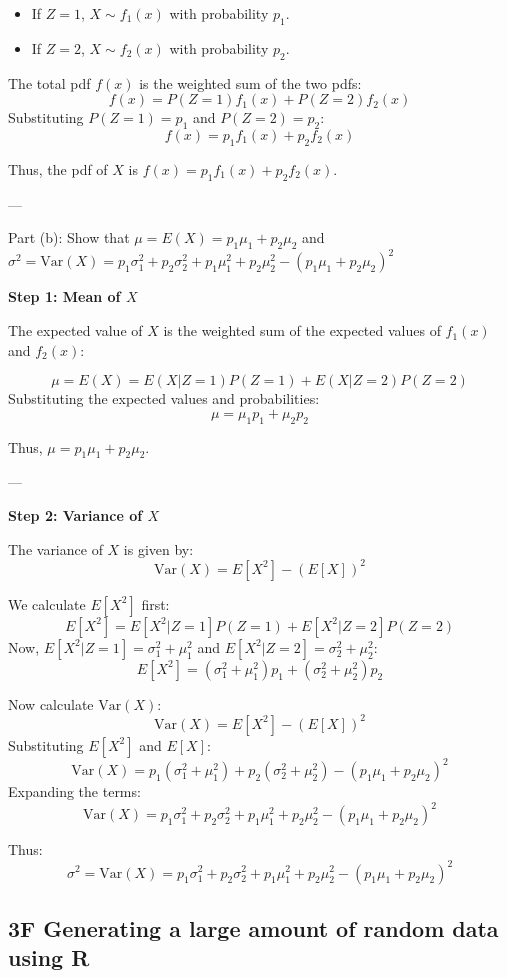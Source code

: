 \documentclass{article}
\begin{document}
\begin{itemize}
    \item If \(Z = 1\), \(X \sim f_1(x)\) with probability \(p_1\).
    \item If \(Z = 2\), \(X \sim f_2(x)\) with probability \(p_2\).
\end{itemize}

The total pdf \(f(x)\) is the weighted sum of the two pdfs:
\[
f(x) = P(Z = 1)f_1(x) + P(Z = 2)f_2(x)
\]
Substituting \(P(Z = 1) = p_1\) and \(P(Z = 2) = p_2\):
\[
f(x) = p_1 f_1(x) + p_2 f_2(x)
\]

Thus, the pdf of \(X\) is \(f(x) = p_1f_1(x) + p_2f_2(x)\).

---

Part (b): Show that \( \mu = E(X) = p_1\mu_1 + p_2\mu_2 \) and \( \sigma^2 = \text{Var}(X) = p_1\sigma_1^2 + p_2\sigma_2^2 + p_1\mu_1^2 + p_2\mu_2^2 - (p_1\mu_1 + p_2\mu_2)^2 \)
\newline

\textbf{Step 1: Mean of \(X\)}

The expected value of \(X\) is the weighted sum of the expected values of \(f_1(x)\) and \(f_2(x)\):

\[
\mu = E(X) = E(X | Z = 1)P(Z = 1) + E(X | Z = 2)P(Z = 2)
\]
Substituting the expected values and probabilities:
\[
\mu = \mu_1 p_1 + \mu_2 p_2
\]

Thus, \( \mu = p_1\mu_1 + p_2\mu_2 \).

---

\textbf{Step 2: Variance of \(X\)}

The variance of \(X\) is given by:
\[
\text{Var}(X) = E[X^2] - (E[X])^2
\]

We calculate \(E[X^2]\) first:
\[
E[X^2] = E[X^2 | Z = 1]P(Z = 1) + E[X^2 | Z = 2]P(Z = 2)
\]
Now, \(E[X^2 | Z = 1] = \sigma_1^2 + \mu_1^2\) and \(E[X^2 | Z = 2] = \sigma_2^2 + \mu_2^2\):
\[
E[X^2] = (\sigma_1^2 + \mu_1^2)p_1 + (\sigma_2^2 + \mu_2^2)p_2
\]

Now calculate \(\text{Var}(X)\):
\[
\text{Var}(X) = E[X^2] - (E[X])^2
\]
Substituting \(E[X^2]\) and \(E[X]\):
\[
\text{Var}(X) = p_1(\sigma_1^2 + \mu_1^2) + p_2(\sigma_2^2 + \mu_2^2) - (p_1\mu_1 + p_2\mu_2)^2
\]
Expanding the terms:
\[
\text{Var}(X) = p_1\sigma_1^2 + p_2\sigma_2^2 + p_1\mu_1^2 + p_2\mu_2^2 - (p_1\mu_1 + p_2\mu_2)^2
\]

Thus:
\[
\sigma^2 = \text{Var}(X) = p_1\sigma_1^2 + p_2\sigma_2^2 + p_1\mu_1^2 + p_2\mu_2^2 - (p_1\mu_1 + p_2\mu_2)^2
\]

\subsection*{3F Generating a large amount of random data using R}
\end{document}
